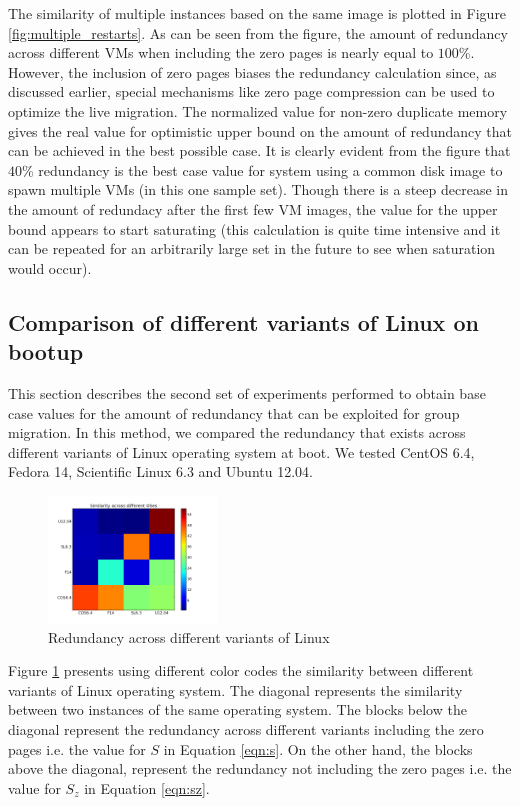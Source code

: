 \documentclass{acm_proc_article-sp}
\begin{document}
The similarity of multiple instances based on the same image is plotted in Figure \ref{fig:multiple_restarts}.  As can be seen from the figure, the amount of redundancy across different VMs when including the zero pages is nearly equal to $100$\%. However, the inclusion of zero pages biases the redundancy calculation since, as discussed earlier, special mechanisms like zero page compression can be used to optimize the live migration. The normalized value for non-zero duplicate memory gives the real value for optimistic upper bound on the amount of redundancy that can be achieved in the best possible case. It is clearly evident from the figure that $40$\% redundancy is the best case value for system using a common disk image to spawn multiple VMs (in this one sample set). Though there is a steep decrease in the amount of redundacy after the first few VM images, the value for the upper bound appears to start saturating (this calculation is quite time intensive and it can be repeated for an arbitrarily large set in the future to see when saturation would occur).


\subsection{Comparison of different variants of Linux on bootup}
This section describes the second set of experiments performed to obtain base case values for the amount of redundancy that can be exploited for group migration. In this method, we compared the redundancy that exists across different variants of Linux operating system at boot. We tested CentOS 6.4, Fedora 14, Scientific Linux 6.3 and Ubuntu 12.04.

\begin{figure}
  \centering
  \includegraphics[width=0.4\textwidth]{images/diff_var.png}
  \caption{Redundancy across different variants of Linux}\label{fig:diff_var}
\end{figure}

Figure \ref{fig:diff_var} presents using different color codes the similarity between different variants of Linux operating system. The diagonal represents the similarity between two instances of the same operating system. The blocks below the diagonal represent the redundancy across different variants including the zero pages i.e. the value for $S$ in Equation \ref{eqn:s}. On the other hand, the blocks above the diagonal, represent the redundancy not including the zero pages i.e. the value for $S_z$ in Equation \ref{eqn:sz}.
\end{document}
